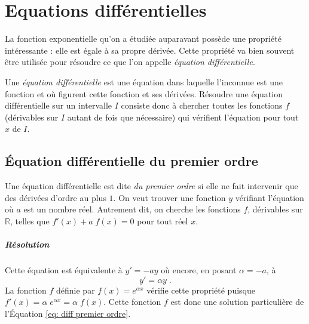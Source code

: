 
\TCDLessonStyleOn
\chapter{Equations diff\'erentielles}
	      La fonction exponentielle qu'on a \'etudi\'ee auparavant poss\`ede une propri\'et\'e int\'eressante :
	      elle est \'egale \`a sa propre d\'eriv\'ee.
      Cette propri\'et\'e va bien souvent \^etre utilis\'ee pour r\'esoudre ce que l'on appelle
      \emph{\'equation diff\'erentielle}.
      \begin{defi}
      Une \emph{\'equation diff\'erentielle} est une \'equation dans laquelle
	      l'inconnue est une fonction et o\`u figurent cette fonction et ses d\'eriv\'ees.
	      R\'esoudre une \'equation diff\'erentielle sur un intervalle $I$ consiste donc \`a chercher toutes les fonctions $f$
      (d\'erivables sur $I$ autant de fois que n\'ecessaire) qui v\'erifient l'\'equation pour tout $x$ de $I$.
      \end{defi}
	            \section{\'Equation diff\'erentielle du premier ordre}
	            Une \'equation diff\'erentielle est dite \emph{du premier ordre}
            si elle ne fait intervenir que des d\'eriv\'ees d'ordre au plus $1$.
            On veut trouver une fonction $y$ v\'erifiant l'\'equation
             o\`u $a$ est un nombre r\'eel.
            Autrement dit, on cherche les fonctions $f$, d\'erivables sur $\mathbb{R}$, telles que ${f'(x) + a \; f(x) = 0}$ pour tout r\'eel $x$.
            \paragraph{R\'esolution}
                  Cette \'equation est \'equivalente \`a $y' = - a y$ o\`u encore, en posant $\alpha = -a$, \`a
                  \begin{equation}
                  \label{eq: diff premier ordre}
                  y' = \alpha y \; .
                  \end{equation}
                  La fonction $f$ d\'efinie par $f(x) = e^{\alpha x}$ v\'erifie cette propri\'et\'e
                  puisque $f'(x) = \alpha \; e^{\alpha x} = \alpha \; f(x)$.
                  Cette fonction $f$ est donc une solution particuli\`ere de l'\'Equation \ref{eq: diff premier ordre}.

